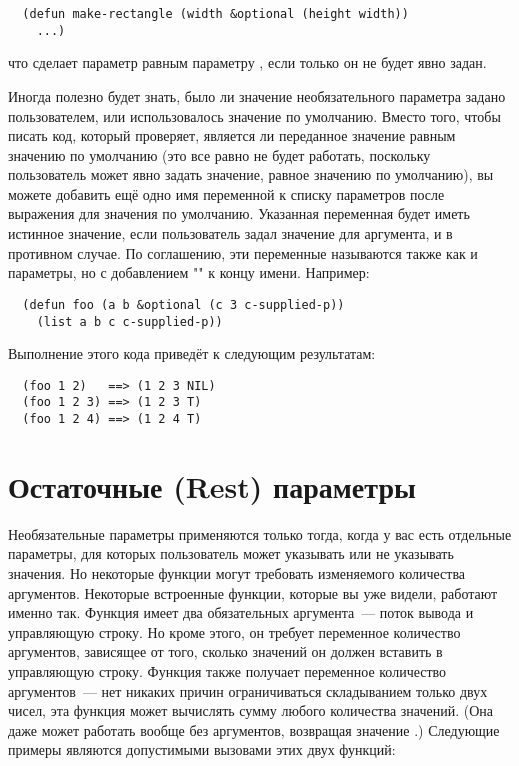 \begin{lstlisting}
  (defun make-rectangle (width &optional (height width)) 
    ...)
\end{lstlisting}

что сделает параметр  равным параметру , если только он не будет
явно задан.

Иногда полезно будет знать, было ли значение необязательного параметра задано
пользователем, или использовалось значение по умолчанию.  Вместо того, чтобы писать код,
который проверяет, является ли переданное значение равным значению по умолчанию (это все
равно не будет работать, поскольку пользователь может явно задать значение, равное
значению по умолчанию), вы можете добавить ещё одно имя переменной к списку параметров
после выражения для значения по умолчанию.  Указанная переменная будет иметь истинное
значение, если пользователь задал значение для аргумента, и  в противном случае.
По соглашению, эти переменные называются также как и параметры, но с добавлением
"" к концу имени. Например:

\begin{lstlisting}
  (defun foo (a b &optional (c 3 c-supplied-p))
    (list a b c c-supplied-p))
\end{lstlisting}

Выполнение этого кода приведёт к следующим результатам:

\begin{verbatim}
  (foo 1 2)   ==> (1 2 3 NIL)
  (foo 1 2 3) ==> (1 2 3 T)
  (foo 1 2 4) ==> (1 2 4 T)
\end{verbatim}

\section{Остаточные (Rest) параметры}

Необязательные параметры применяются только тогда, когда у вас есть отдельные параметры,
для которых пользователь может указывать или не указывать значения.  Но некоторые функции
могут требовать изменяемого количества аргументов.  Некоторые встроенные функции, которые
вы уже видели, работают именно так.  Функция  имеет два обязательных
аргумента~--- поток вывода и управляющую строку.  Но кроме этого, он требует переменное
количество аргументов, зависящее от того, сколько значений он должен вставить в
управляющую строку.  Функция \code{+} также получает переменное количество аргументов~---
нет никаких причин ограничиваться складыванием только двух чисел, эта функция может
вычислять сумму любого количества значений. (Она даже может работать вообще без
аргументов, возвращая значение .)  Следующие примеры являются допустимыми вызовами
этих двух функций:

